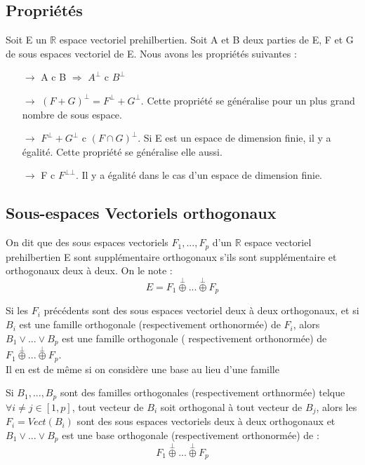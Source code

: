 \subsection{Propriétés}
Soit E un $\mathbb{R}$ espace vectoriel prehilbertien. Soit A et B deux parties de E, F et G de sous espaces vectoriel de E. Nous avons les propriétés suivantes : 
\begin{itemize}
 \item[$\rightarrow$] A c B $\Rightarrow$ $A^{\bot}$ c $B^{\bot}$
 \item[$\rightarrow$] $(F + G)^{\bot} = F^{\bot} + G^{\bot}$. Cette propriété se généralise pour un plus grand nombre de sous espace.
 \item[$\rightarrow$] $F^{\bot} + G^{\bot}$ c $(F\cap G)^{\bot}$. Si E est un espace de dimension finie, il y a égalité. Cette propriété se généralise elle aussi. 
 \item[$\rightarrow$] F c $F^{\bot\bot}$. Il y a égalité dans le cas d'un espace de dimension finie.
\end{itemize}
\subsection{Sous-espaces Vectoriels orthogonaux}
\begin{de}
On dit que des sous espaces vectoriels $F_1,...,F_p$ d'un $\mathbb{R}$ espace vectoriel prehilbertien E sont supplémentaire orthogonaux s'ils sont supplémentaire et orthogonaux deux à deux. On le note : 
$$E = F_1 \overset{\bot}\oplus ... \overset{\bot}\oplus F_p$$
\end{de}
\begin{prop}
Si les $F_i$ précédents sont des sous espaces vectoriel deux à deux orthogonaux, et si $B_i$ est une famille orthogonale (respectivement orthonormée) de $F_i$, alors $B_1 \vee ... \vee B_p$ est une famille orthogonale ( respectivement orthonormée) de $F_1 \overset{\bot}\oplus ... \overset{\bot}\oplus F_p$.\\
Il en est de même si on considère une base au lieu d'une famille
\end{prop}
\begin{prop}
Si $B_1,...,B_p$ sont des familles orthogonales (respectivement orthnormée) telque $\forall i \neq j \in [1,p]$, tout vecteur de $B_i$ soit orthogonal à tout vecteur de $B_j$, alors les $F_i = Vect(B_i)$ sont des sous espaces vectoriels deux à deux orthogonaux et $B_1\vee...\vee B_p$ est une base orthogonale (respectivement orthonormée) de :
$$F_1 \overset{\bot}\oplus ... \overset{\bot}\oplus F_p$$
\end{prop}
